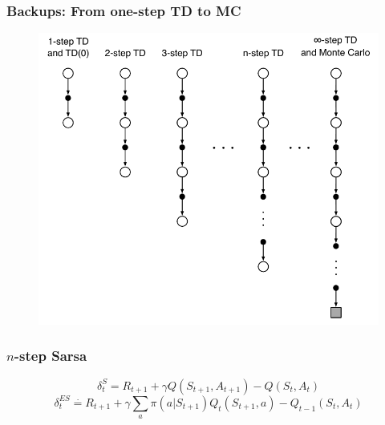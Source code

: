 \documentclass{beamer}
\begin{document}
\begin{frame}
  \frametitle{Backups: From one-step TD to MC}
  \begin{figure}
    \centering
    \includegraphics[height=0.7 \textheight]{one-step-to-multi-step}
  \end{figure}
\end{frame}

\begin{frame}
  \frametitle{$n$-step Sarsa}
  $$\delta^{S}_t = R_{t + 1} + \gamma Q(S_{t + 1}, A_{t + 1}) - Q(S_t, A_t)$$
  $$\delta^{ES}_t \overset{\cdot}{=} R_{t + 1} +
    \gamma \sum_{a} \pi(a | S_{t + 1}) Q_t(S_{t + 1}, a) - Q_{t - 1}(S_t, A_t)$$
\end{frame}
\end{document}
